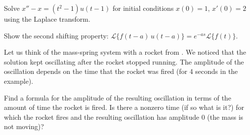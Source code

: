 \begin{exercise}
	Solve $x''-x = (t^2-1) u(t-1)$ for initial conditions $x(0)=1$, $x'(0) = 2$
	using the Laplace transform.
\end{exercise}

\begin{exercise}
Show the second shifting property: 
$\mathcal{L} \bigl\{ f(t-a) \, u(t-a) \bigr\}
= e^{-as} \mathcal{L} \bigl\{ f(t) \bigr\}$.
\end{exercise}

\begin{exercise}
Let us think of the mass-spring system with a rocket from
.  We noticed that the solution kept oscillating
after the rocket stopped running.  The amplitude of the oscillation depends
on the time that the rocket was fired (for 4 seconds in the example).
\begin{tasks}
\task
Find a formula for the amplitude of the resulting oscillation
in terms of the amount of time the rocket is fired.
\task
 Is there
a nonzero time (if so what is it?)
for which the rocket fires and the resulting oscillation
has amplitude 0 (the mass is not moving)?
\end{tasks}
\end{exercise}

